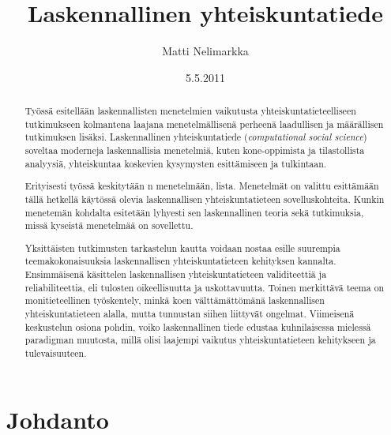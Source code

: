\documentclass[finnish,gradu,twoside,12pt]{tktltiki}
\begin{document}

\title{Laskennallinen yhteiskuntatiede}
\author{Matti Nelimarkka}
\date{5.5.2011}

\numberofpagesinformation{}

\keywords{}

\maketitle

\begin{abstract}
Työssä esitellään laskennallisten menetelmien vaikutusta yhteiskuntatieteelliseen tutkimukseen kolmantena laajana menetelmällisenä perheenä laadullisen ja määrällisen tutkimuksen lisäksi. Laskennallinen yhteiskuntatiede (\textit{computational social science}) soveltaa moderneja laskennallisia menetelmiä, kuten kone-oppimista ja tilastollista analyysiä, yhteiskuntaa koskevien kysymysten esittämiseen ja tulkintaan.

Erityisesti työssä keskitytään n menetelmään, lista. Menetelmät on valittu esittämään tällä hetkellä käytössä olevia laskennallisen yhteiskuntatieteen sovelluskohteita. Kunkin menetemän kohdalta esitetään lyhyesti sen laskennallinen teoria sekä tutkimuksia, missä kyseistä menetelmää on sovellettu.

Yksittäisten tutkimusten tarkastelun kautta voidaan nostaa esille suurempia teemakokonaisuuksia laskennallisen yhteiskuntatieteen kehityksen kannalta. Ensimmäisenä käsittelen laskennallisen yhteiskuntatieteen validiteettiä ja reliabiliteettia, eli tulosten oikeellisuutta ja uskottavuutta. Toinen merkittävä teema on monitieteellinen työskentely, minkä koen välttämättömänä laskennallisen yhteiskuntatieteen alalla, mutta tunnustan siihen liittyvät ongelmat. Viimeisenä keskustelun osiona pohdin, voiko laskennallinen tiede edustaa kuhnilaisessa mielessä paradigman muutosta, millä olisi laajempi vaikutus yhteiskuntatieteen kehitykseen ja tulevaisuuteen.
\end{abstract}

\mytableofcontents

\section{Johdanto}
\end{document}
